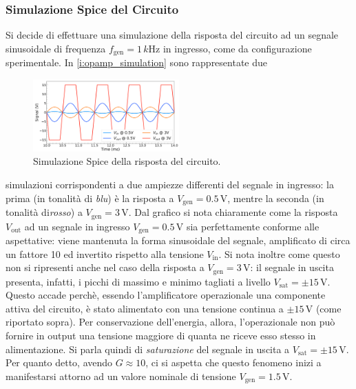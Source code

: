 \documentclass[a4paper,11pt]{article} %
\begin{document}

\subsubsection{Simulazione Spice del Circuito}\label{s:spice} Si decide di effettuare una simulazione della risposta del
circuito ad un segnale sinusoidale di frequenza $f_{\text{gen}}=1\,\si{k\hertz}$ in ingresso, come da configurazione
sperimentale. In \autoref{i:opamp_simulation} sono rappresentate due 

\begin{figure}
	\centering
	\includegraphics[width=0.5\textwidth]{../Plots/Report_Plots/opamp_spice_py.png}
	\caption{\footnotesize Simulazione Spice della risposta del circuito.}
	\label{i:opamp_simulation}
\end{figure}

\noindent simulazioni corrispondenti a due ampiezze differenti del segnale in ingresso: la prima (in tonalità di
\textit{blu}) è la risposta a $V_{\text{gen}}=0.5\,\si{\volt}$, mentre la seconda (in tonalità di\textit{rosso}) a
$V_{\text{gen}}=3\,\si{\volt}$. Dal grafico si nota chiaramente come la risposta $V_{\text{out}}$ ad un segnale in
ingresso $V_{\text{gen}}=0.5\,\si{\volt}$ sia perfettamente conforme alle aspettative: viene mantenuta la forma
sinusoidale del segnale, amplificato di circa un fattore 10 ed invertito rispetto alla tensione $V_{\text{in}}$. Si nota
inoltre come questo non si ripresenti anche nel caso della risposta a $V_{\text{gen}}=3\,\si{\volt}$: il segnale in
uscita presenta, infatti, i picchi di massimo e minimo tagliati a livello $V_{\text{sat}}=\pm 15\,\si{\volt}$. Questo
accade perchè, essendo l'amplificatore operazionale una componente attiva del circuito, è stato alimentato con una
tensione continua a $\pm 15\,\si{\volt}$ (come riportato sopra). Per conservazione dell'energia, allora, l'operazionale
non può fornire in output una tensione maggiore di quanta ne riceve esso stesso in alimentazione. Si parla quindi di
\textit{saturazione} del segnale in uscita a $V_{\text{sat}}=\pm 15\,\si{\volt}$. Per quanto detto,  avendo $G \approx
10$, ci si aspetta che questo fenomeno inizi a manifestarsi attorno ad un valore nominale di tensione
$V_{\text{gen}}=1.5\,\si{\volt}$.
\end{document}
